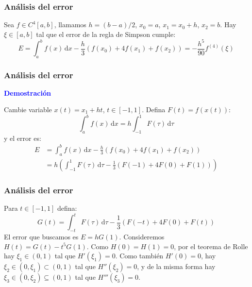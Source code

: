 \documentclass[english, spanish, fleqn,%
hyperref = {colorlinks, urlcolor = blue}%
]{beamer}
\begin{document}
\begin{frame}
  \setcounter{beamerpauses}{2}
  \frametitle{Análisis del error}

  \begin{theorem}
    Sea \(f \in C^4 [a, b]\),
    llamamos \(h = (b - a) / 2\),
    \(x_0 = a\), \(x_1 = x_0 + h\), \(x_2 = b\).
    Hay \(\xi \in [a, b]\) tal que el error de la regla de Simpson cumple:
    \begin{equation*}
      E
        = \int_a^b f(x) \, \mathrm{d} x
             - \frac{h}{3} (f(x_0) + 4 f(x_1) + f(x_2))
        = - \frac{h^5}{90} f^{(4)}(\xi)
    \end{equation*}
  \end{theorem}
\end{frame}

\begin{frame}
  \frametitle{Análisis del error}

  \textbf{\large\textcolor{blue}{Demostración}}

  Cambie variable \(x(t) = x_1 + h t\),
  \(t \in [-1, 1]\).
  Defina \(F(t) = f(x(t))\):
  \begin{equation*}
    \int_a^b f(x) \, \mathrm{d} x
      = h \int_{-1}^1 F(\tau) \, \mathrm{d} \tau
  \end{equation*}
  y el error es:
  \begin{align*}
    E
      &= \int_a^b f(x) \, \mathrm{d} x
           - \frac{h}{3} (f(x_0) + 4 f(x_1) + f(x_2)) \\
      &= h \left(
              \int_{-1}^1 F(\tau) \, \mathrm{d} \tau
                - \frac{1}{3} \left( F(-1) + 4 F(0) + F(1) \right)
           \right)
  \end{align*}
\end{frame}

\begin{frame}
  \frametitle{Análisis del error}

  Para \(t \in [-1, 1]\) defina:
  \begin{equation*}
    G(t)
      = \int_{-t}^t F(\tau) \, \mathrm{d} \tau
          - \frac{1}{3} \left( F(-t) + 4 F(0) + F(t) \right)
  \end{equation*}
  El error que buscamos es \(E = h G(1)\).
  Consideremos \(H(t) = G(t) - t^5 G(1)\).
  Como \(H(0) = H(1) = 0\),
  por el teorema de Rolle hay \(\xi_1 \in (0, 1)\)
  tal que \(H'(\xi_1) = 0\).
  Como también \(H'(0) = 0\),
  hay \(\xi_2 \in (0, \xi_1) \subset (0, 1)\) tal que \(H''(\xi_2) = 0\),
  y de la misma forma hay \(\xi_3 \in (0, \xi_2) \subseteq (0, 1)\)
  tal que \(H'''(\xi_3) = 0\).
\end{frame}
\end{document}

